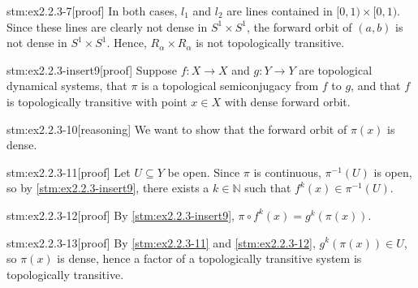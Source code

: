 \begin{stm}{stm:ex2.2.3-7}[proof]
In both cases, $l_1$ and $l_2$ are lines contained in $[0,1) \times [0,1)$. Since these lines are clearly not dense in $S^1 \times S^1$, the forward orbit of $(a,b)$ is not dense in $S^1 \times S^1$. Hence, $R_\alpha \times R_\alpha$ is not topologically transitive.
\end{stm}

\begin{stm}{stm:ex2.2.3-insert9}[proof]
Suppose $f: X \to X$ and $g: Y \to Y$ are topological dynamical systems, that $\pi$ is a topological semiconjugacy from $f$ to $g$, and that $f$ is topologically transitive with point $x \in X$ with dense forward orbit.
\end{stm}

\begin{stm}{stm:ex2.2.3-10}[reasoning]
We want to show that the forward orbit of $\pi(x)$ is dense.
\end{stm}

\begin{stm}{stm:ex2.2.3-11}[proof]
Let $U \subseteq Y$ be open. Since $\pi$ is continuous, $\pi^{-1}(U)$ is open, so by \ref{stm:ex2.2.3-insert9}, there exists a $k \in \mathbb{N}$ such that $f^k(x) \in \pi^{-1}(U)$.
\end{stm}

\begin{stm}{stm:ex2.2.3-12}[proof]
By \ref{stm:ex2.2.3-insert9}, $\pi \circ f^k(x) = g^k(\pi(x))$.
\end{stm}

\begin{stm}{stm:ex2.2.3-13}[proof]
By \ref{stm:ex2.2.3-11} and \ref{stm:ex2.2.3-12}, $g^k(\pi(x)) \in U$, so $\pi(x)$ is dense, hence a factor of a topologically transitive system is topologically transitive.
\end{stm}
